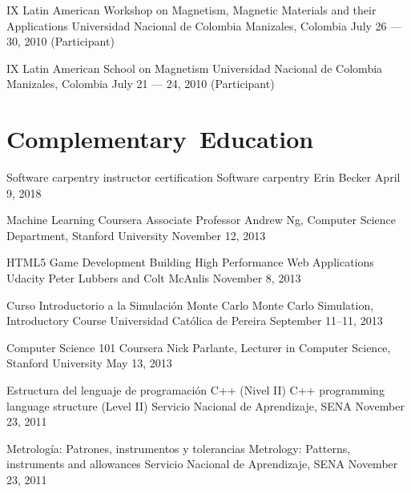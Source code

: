 \documentclass[12pt,english]{moderncv}
\begin{document}
        {IX Latin American Workshop on Magnetism, Magnetic Materials and their Applications}
        {Universidad Nacional de Colombia}
        {Manizales, Colombia}
        {July 26 --- 30, 2010}
        {(Participant)}

        {IX Latin American School on Magnetism}
        {Universidad Nacional de Colombia}
        {Manizales, Colombia}
        {July 21 --- 24, 2010}
        {(Participant)}


\section{Complementary~Education}

        {Software carpentry instructor certification}
        {}
        {Software carpentry}
        {Erin Becker}
        {April 9, 2018}

        {Machine Learning}
        {}
        {Coursera}
        {Associate Professor Andrew Ng, Computer Science Department, Stanford University}
        {November 12, 2013}

        {HTML5 Game Development}
        {Building High Performance Web Applications}
        {Udacity}
        {Peter Lubbers and Colt McAnlis}
        {November 8, 2013}

        {Curso Introductorio a la Simulación Monte Carlo}
        {Monte Carlo Simulation, Introductory Course}
        {Universidad Católica de Pereira}
        {}
        {September 11--11, 2013}

        {Computer Science 101}
        {}
        {Coursera}
        {Nick Parlante, Lecturer in Computer Science, Stanford University}
        {May 13, 2013}

        {Estructura del lenguaje de programación C++ (Nivel II)}
        {C++ programming language structure (Level II)}
        {Servicio Nacional de Aprendizaje, SENA}
        {}
        {November 23, 2011}

        {Metrología: Patrones, instrumentos y tolerancias}
        {Metrology: Patterns, instruments and allowances}
        {Servicio Nacional de Aprendizaje, SENA}
        {}
        {November 23, 2011}
\end{document}
